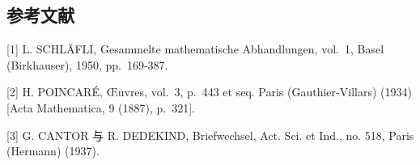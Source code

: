 \subsection*{参考文献}

{[}1{]} L. SCHLÄFLI, Gesammelte mathematische Abhandlungen, vol.~1, Basel (Birkhauser), 1950, pp.~169-387.

{[}2{]} H. POINCARÉ, Œuvres, vol.~3, p.~443 et seq. Paris (Gauthier-Villars) (1934) {[}Acta Mathematica, 9 (1887), p.~321{]}.

{[}3{]} G. CANTOR 与 R. DEDEKIND, Briefwechsel, Act. Sci. et Ind., no. 518, Paris (Hermann) (1937).

